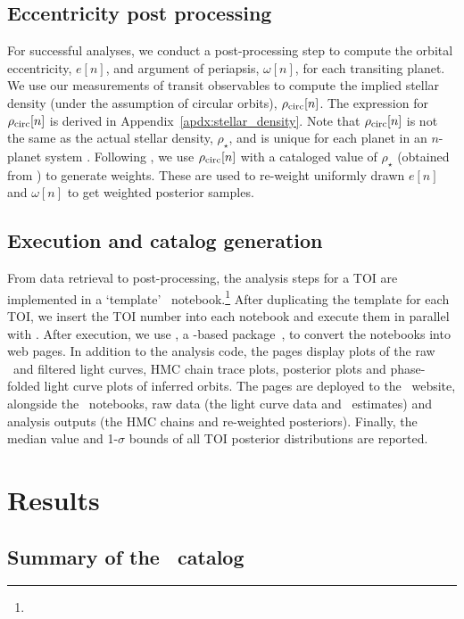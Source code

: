 \documentclass[floatfix,ApJL,twocolumn]{aastex631}
\begin{document}
\subsection{Eccentricity post processing}

For successful analyses, we conduct a post-processing step to compute the orbital eccentricity, $e[n]$, and argument of periapsis, $\omega[n]$, for each transiting planet.
We use our measurements of transit observables to compute the implied stellar density (under the assumption of circular orbits), $\rho_{\rm circ}[n]$.
The expression for $\rho_{\rm circ}[n]$ is derived in Appendix~\ref{apdx:stellar_density}.
Note that $\rho_{\rm circ}[n]$ is not the same as the actual stellar density, $\rho_{\star}$, and is unique for each planet in an $n$-planet system \citep[see, for example,][]{Dawson:2012:ApJ, Kipping:2012:MNRAS}.
Following \citet{Dawson:2012:ApJ}, we use $\rho_{\rm circ}[n]$ with a cataloged value of $\rho_\star$ (obtained from \mast) to generate weights.
These are used to re-weight uniformly drawn $e[n]$ and $\omega[n]$ to get weighted posterior samples.

\subsection{Execution and catalog generation}

From data retrieval to post-processing, the analysis steps for a TOI are implemented in a `template' \jupyter\ notebook.\footnote{\toiTemplateLink}
After duplicating the template for each TOI, we insert the TOI number into each notebook and execute them in parallel with \nbconvert.
After execution, we use \jupyterbook, a \sphinx-based package~\citep{sphinx_doc}, to convert the notebooks into web pages.
In addition to the analysis code, the pages display plots of the raw \mast\ and filtered light curves, HMC chain trace plots, posterior plots and phase-folded light curve plots of inferred orbits.
The pages are deployed to the \tessAtlas\ website, alongside the \jupyter\ notebooks, raw data (the light curve data and \exofop\ estimates) and analysis outputs (the HMC chains and re-weighted posteriors).
Finally, the median value and 1-$\sigma$ bounds of all TOI posterior distributions are reported.

\section{Results}\label{sec:results}


\subsection{Summary of the \tessAtlas\ catalog}
\end{document}
